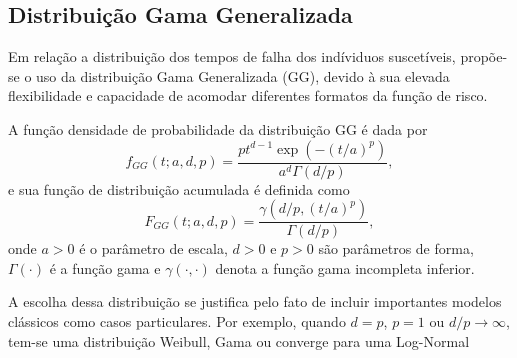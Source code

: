 



\subsection{Distribuição Gama Generalizada}

Em relação a distribuição dos tempos de falha dos indíviduos suscetíveis, propõe-se o uso da distribuição
Gama Generalizada (GG), devido à sua elevada flexibilidade e capacidade de acomodar diferentes formatos da
função de risco.

A função densidade de probabilidade da distribuição GG é dada por
\[
f_{GG}(t;a,d,p)=
\frac{pt^{d-1}\exp\left(-(t/a)^p\right)}
{a^d\Gamma(d/p)},
\]
e sua função de distribuição acumulada é definida como
\[
F_{GG}(t;a,d,p)=
\frac{\gamma\left(d/p,(t/a)^p\right)}
{\Gamma(d/p)},
\]
onde $a>0$ é o parâmetro de escala, $d>0$ e $p>0$ são parâmetros de forma, $\Gamma(\cdot)$ é a função gama e $\gamma(\cdot,\cdot)$ denota a função gama incompleta inferior.

A escolha dessa distribuição se justifica pelo fato de incluir importantes modelos clássicos como casos particulares. Por exemplo, quando $d=p$, $p=1$ ou $d/p \to \infty$, tem-se uma
distribuição Weibull, Gama ou converge para uma Log-Normal



